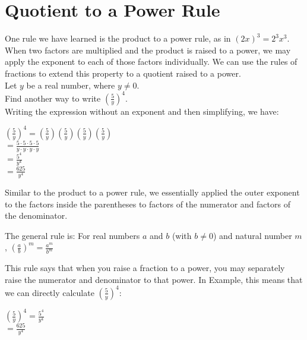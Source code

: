 \documentclass{ximera}
\begin{document}
\section{Quotient to a Power Rule}
  One rule we have learned is the product to a power rule,
      as in $(2x)^{3}=2^{3}x^{3}$.
      When two factors are multiplied and the product is raised to a power,
      we may apply the exponent to each of those factors individually.
      We can use the rules of fractions to extend this property to a
      quotient raised to a power.\\
   Let $y$ be a real number, where $y \neq 0$.\\
          Find another way to write $\left(\frac{5}{y}\right)^4$.\\
     Writing the expression without an exponent and then simplifying, we have:
  \begin{center}
            $\left( \frac{5}{y} \right)^4 = \left( \frac{5}{y} \right) \left( \frac{5}{y} \right) \left( \frac{5}{y} \right) \left( \frac{5}{y} \right)$\\
            $= \frac{5 \cdot 5 \cdot 5 \cdot 5}{y \cdot y \cdot y \cdot y}$\\
            $= \frac{5^4}{y^4}$\\
            $= \frac{625}{y^4}$\\
\end{center}
        Similar to the product to a power rule,
          we essentially applied the outer exponent to the factors
          inside the parentheses to factors of the numerator and
          factors of the denominator.
\begin{callout}
          The general rule is:
       For real numbers $a$ and $b$
          (with $b \neq 0$)
          and natural number $m$,
        $
            \left( \frac{a}{b}  \right)^{m} = \frac{a^{m}}{b^{m}}
          $
\end{callout}
 This rule says that when you raise a fraction to a power,
      you may separately raise the numerator and denominator to that power.
      In Example,
      this means that we can directly calculate $\left( \frac{5}{y} \right)^4$:
   \begin{center}
        $\left( \frac{5}{y} \right)^4 = \frac{5^4}{y^4}$\\
        $=\frac{625}{y^4}$
\end{center}
\end{document}

